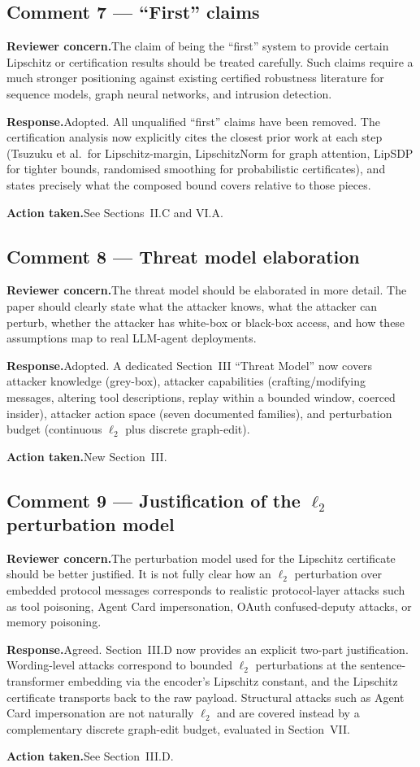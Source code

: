 \documentclass[11pt,a4paper]{article}
\newcommand{\concern}[1]{\noindent\textbf{Reviewer concern.}\quad #1\par\vspace{0.3em}}
\newcommand{\response}[1]{\noindent\textbf{Response.}\quad #1\par\vspace{0.3em}}
\newcommand{\action}[1]{\noindent\textbf{Action taken.}\quad #1\par\vspace{0.8em}}
\begin{document}
\subsection*{Comment 7 --- ``First'' claims}
\concern{The claim of being the ``first'' system to provide certain Lipschitz or certification results should be treated carefully. Such claims require a much stronger positioning against existing certified robustness literature for sequence models, graph neural networks, and intrusion detection.}
\response{Adopted. All unqualified ``first'' claims have been removed. The certification analysis now explicitly cites the closest prior work at each step (Tsuzuku et al.\ for Lipschitz-margin, LipschitzNorm for graph attention, LipSDP for tighter bounds, randomised smoothing for probabilistic certificates), and states precisely what the composed bound covers relative to those pieces.}
\action{See Sections~II.C and VI.A.}

\subsection*{Comment 8 --- Threat model elaboration}
\concern{The threat model should be elaborated in more detail. The paper should clearly state what the attacker knows, what the attacker can perturb, whether the attacker has white-box or black-box access, and how these assumptions map to real LLM-agent deployments.}
\response{Adopted. A dedicated Section~III ``Threat Model'' now covers attacker knowledge (grey-box), attacker capabilities (crafting/modifying messages, altering tool descriptions, replay within a bounded window, coerced insider), attacker action space (seven documented families), and perturbation budget (continuous $\ell_{2}$ plus discrete graph-edit).}
\action{New Section~III.}

\subsection*{Comment 9 --- Justification of the $\ell_{2}$ perturbation model}
\concern{The perturbation model used for the Lipschitz certificate should be better justified. It is not fully clear how an $\ell_{2}$ perturbation over embedded protocol messages corresponds to realistic protocol-layer attacks such as tool poisoning, Agent Card impersonation, OAuth confused-deputy attacks, or memory poisoning.}
\response{Agreed. Section~III.D now provides an explicit two-part justification. Wording-level attacks correspond to bounded $\ell_{2}$ perturbations at the sentence-transformer embedding via the encoder's Lipschitz constant, and the Lipschitz certificate transports back to the raw payload. Structural attacks such as Agent Card impersonation are not naturally $\ell_{2}$ and are covered instead by a complementary discrete graph-edit budget, evaluated in Section~VII.}
\action{See Section~III.D.}
\end{document}
